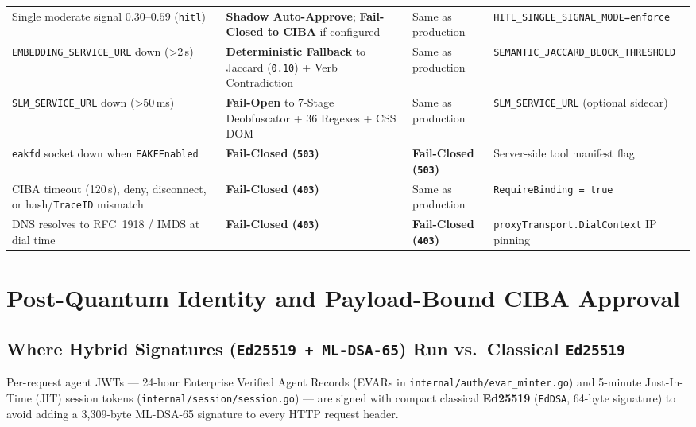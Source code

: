 \documentclass[11pt, a4paper]{article}
\begin{document}
\begin{small}
\begin{longtable}{@{} p{4.4cm} p{3.8cm} p{3.4cm} p{3.8cm} @{}}
\addlinespace
Single moderate signal $0.30$--$0.59$ (\texttt{hitl}) & \textbf{Shadow Auto-Approve}; \textbf{Fail-Closed to CIBA} if configured & Same as production & \texttt{HITL\_SINGLE\_SIGNAL\_MODE=enforce} \\
\addlinespace
\texttt{EMBEDDING\_SERVICE\_URL} down (>2\,s) & \textbf{Deterministic Fallback} to Jaccard (\texttt{0.10}) + Verb Contradiction & Same as production & \texttt{SEMANTIC\_JACCARD\_BLOCK\_THRESHOLD} \\
\addlinespace
\texttt{SLM\_SERVICE\_URL} down (>50\,ms) & \textbf{Fail-Open} to 7-Stage Deobfuscator + 36 Regexes + CSS DOM & Same as production & \texttt{SLM\_SERVICE\_URL} (optional sidecar) \\
\addlinespace
\texttt{eakfd} socket down when \texttt{EAKFEnabled} & \textbf{Fail-Closed (\texttt{503})} & \textbf{Fail-Closed (\texttt{503})} & Server-side tool manifest flag \\
\addlinespace
CIBA timeout (120\,s), deny, disconnect, or hash/\texttt{TraceID} mismatch & \textbf{Fail-Closed (\texttt{403})} & Same as production & \texttt{RequireBinding = true} \\
\addlinespace
DNS resolves to RFC~1918 / IMDS at dial time & \textbf{Fail-Closed (\texttt{403})} & \textbf{Fail-Closed (\texttt{403})} & \texttt{proxyTransport.DialContext} IP pinning \\
\end{longtable}
\end{small}

\section{Post-Quantum Identity and Payload-Bound CIBA Approval}
\label{sec:pqc}

\subsection{Where Hybrid Signatures (\texttt{Ed25519 + ML-DSA-65}) Run vs.\ Classical \texttt{Ed25519}}
\label{subsec:pqc-reframing}

Per-request agent JWTs --- 24-hour Enterprise Verified Agent Records (EVARs in \texttt{internal/auth/evar\_minter.go}) and 5-minute Just-In-Time (JIT) session tokens (\texttt{internal/session/session.go}) --- are signed with compact classical \textbf{Ed25519} (\texttt{EdDSA}, 64-byte signature) to avoid adding a 3,309-byte ML-DSA-65 signature to every HTTP request header.
\end{document}
